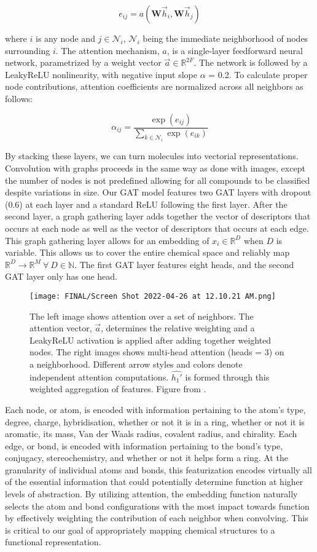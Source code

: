 \documentclass{article}
\begin{document}
$$e_{ij} = a\left(\textbf{W}\vec{h}_i,\textbf{W}\vec{h}_j\right)$$

where $i$ is any node and $j \in \mathcal{N}_i$, $\mathcal{N}_i$ being the immediate neighborhood of nodes surrounding $i$.  The attention mechanism, $a$, is a single-layer feedforward neural network,
parametrized by a weight vector $\vec{a} \in \mathbb{R}^{2F}$.  The network is followed by a LeakyReLU nonlinearity, with negative input slope $\alpha$ = 0.2.  To calculate proper node contributions, attention coefficients are normalized across all neighbors as follows:

    $$\alpha_{ij} = \frac{\exp{\left(e_{ij}\right)}}{\sum_{k\in \mathcal{N}_i}\exp{\left(e_{ik}\right)}}$$

By stacking these layers, we can turn molecules into vectorial representations.  Convolution with graphs proceeds in the same way as done with images, except the number of nodes is not predefined allowing for all compounds to be classified despite variations in size.  Our GAT model features two GAT layers with dropout (0.6) at each layer and a standard ReLU following the first layer.  After the second layer, a graph gathering layer adds together the vector of descriptors that occurs at each node as well as the vector of descriptors that occurs at each edge.  This graph gathering layer allows for an embedding of $x_i \in \mathbb{R}^D$ when $D$ is variable.  This allows us to cover the entire chemical space and reliably map $\mathbb{R}^D \to \mathbb{R}^M \ \forall \ D \in \mathbb{N}$.  The first GAT layer features eight heads, and the second GAT layer only has one head.

\begin{figure}
  \centering
  \texttt{[image: FINAL/Screen Shot 2022-04-26 at 12.10.21 AM.png]}
  \caption{The left image shows attention over a set of neighbors.  The attention vector, $\vec{a}$, determines the relative weighting and a LeakyReLU activation is applied after adding together weighted nodes.  The right images shows multi-head attention (heads = 3) on a neighborhood.  Different arrow styles and colors denote independent attention computations.  $\hat{h_1'}$ is formed through this weighted aggregation of features.  Figure from \cite{velickovic2017graph}.}
\end{figure}

Each node, or atom, is encoded with information pertaining to the atom's type, degree, charge, hybridisation, whether or not it is in a ring, whether or not it is aromatic, its mass, Van der Waals radius, covalent radius, and chirality.  Each edge, or bond, is encoded with information pertaining to the bond's type, conjugacy, stereochemistry, and whether or not it helps form a ring.  At the granularity of individual atoms and bonds, this featurization encodes virtually all of the essential information that could potentially determine function at higher levels of abstraction.  By utilizing attention, the embedding function naturally selects the atom and bond configurations with the most impact towards function by effectively weighting the contribution of each neighbor when convolving.  This is critical to our goal of appropriately mapping chemical structures to a functional representation.
\end{document}
